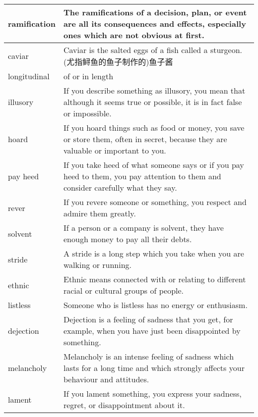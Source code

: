 \documentclass{article}
\begin{document}
\begin{center}
\begin{longtable}{|l|p{7cm}|}
\hline
ramification
&
The ramifications of a decision, plan, or event are all its consequences and effects, especially ones which are not obvious at first.
\\

\hline
caviar
&
Caviar is the salted eggs of a fish called a sturgeon. (尤指鲟鱼的鱼子制作的)鱼子酱
\\

\hline
longitudinal
&
of or in length
\\

\hline
illusory
&
If you describe something as illusory, you mean that although it seems true or possible, it is in fact false or impossible.
\\

\hline
hoard
&
If you hoard things such as food or money, you save or store them, often in secret, because they are valuable or important to you.
\\

\hline
pay heed
&
If you take heed of what someone says or if you pay heed to them, you pay attention to them and consider carefully what they say.
\\

\hline
rever
&
If you revere someone or something, you respect and admire them greatly.
\\

\hline
solvent
&
If a person or a company is solvent, they have enough money to pay all their debts.
\\

\hline
stride
&
A stride is a long step which you take when you are walking or running.
\\

\hline
ethnic
&
Ethnic means connected with or relating to different racial or cultural groups of people.
\\

\hline
listless
&
Someone who is listless has no energy or enthusiasm.
\\

\hline
dejection
&
Dejection is a feeling of sadness that you get, for example, when you have just been disappointed by something.
\\

\hline
melancholy
&
Melancholy is an intense feeling of sadness which lasts for a long time and which strongly affects your behaviour and attitudes.
\\

\hline
lament
&
If you lament something, you express your sadness, regret, or disappointment about it.
\\


\end{longtable}
\end{center}
\end{document}
